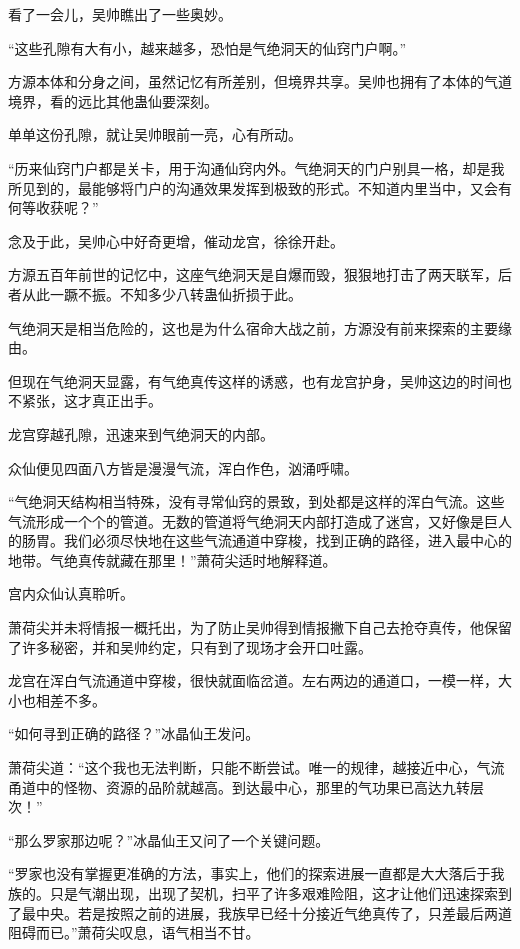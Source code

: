 \begin{this_body}
看了一会儿，吴帅瞧出了一些奥妙。

“这些孔隙有大有小，越来越多，恐怕是气绝洞天的仙窍门户啊。”

方源本体和分身之间，虽然记忆有所差别，但境界共享。吴帅也拥有了本体的气道境界，看的远比其他蛊仙要深刻。

单单这份孔隙，就让吴帅眼前一亮，心有所动。

“历来仙窍门户都是关卡，用于沟通仙窍内外。气绝洞天的门户别具一格，却是我所见到的，最能够将门户的沟通效果发挥到极致的形式。不知道内里当中，又会有何等收获呢？”

念及于此，吴帅心中好奇更增，催动龙宫，徐徐开赴。

方源五百年前世的记忆中，这座气绝洞天是自爆而毁，狠狠地打击了两天联军，后者从此一蹶不振。不知多少八转蛊仙折损于此。

气绝洞天是相当危险的，这也是为什么宿命大战之前，方源没有前来探索的主要缘由。

但现在气绝洞天显露，有气绝真传这样的诱惑，也有龙宫护身，吴帅这边的时间也不紧张，这才真正出手。

龙宫穿越孔隙，迅速来到气绝洞天的内部。

众仙便见四面八方皆是漫漫气流，浑白作色，汹涌呼啸。

“气绝洞天结构相当特殊，没有寻常仙窍的景致，到处都是这样的浑白气流。这些气流形成一个个的管道。无数的管道将气绝洞天内部打造成了迷宫，又好像是巨人的肠胃。我们必须尽快地在这些气流通道中穿梭，找到正确的路径，进入最中心的地带。气绝真传就藏在那里！”萧荷尖适时地解释道。

宫内众仙认真聆听。

萧荷尖并未将情报一概托出，为了防止吴帅得到情报撇下自己去抢夺真传，他保留了许多秘密，并和吴帅约定，只有到了现场才会开口吐露。

龙宫在浑白气流通道中穿梭，很快就面临岔道。左右两边的通道口，一模一样，大小也相差不多。

“如何寻到正确的路径？”冰晶仙王发问。

萧荷尖道：“这个我也无法判断，只能不断尝试。唯一的规律，越接近中心，气流甬道中的怪物、资源的品阶就越高。到达最中心，那里的气功果已高达九转层次！”

“那么罗家那边呢？”冰晶仙王又问了一个关键问题。

“罗家也没有掌握更准确的方法，事实上，他们的探索进展一直都是大大落后于我族的。只是气潮出现，出现了契机，扫平了许多艰难险阻，这才让他们迅速探索到了最中央。若是按照之前的进展，我族早已经十分接近气绝真传了，只差最后两道阻碍而已。”萧荷尖叹息，语气相当不甘。


\end{this_body}

